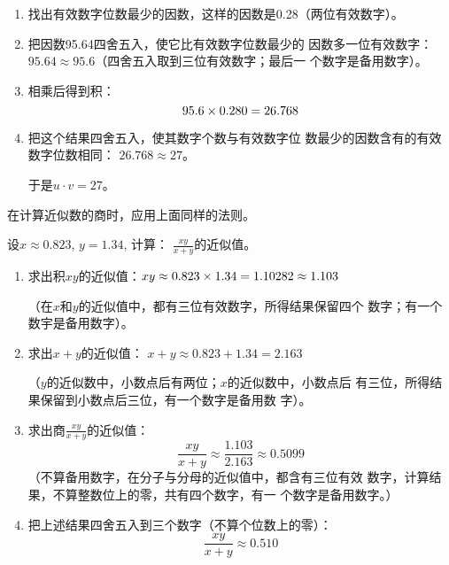 \begin{solution}
\begin{enumerate}
    \item 找出有效数字位数最少的因数，这样的因数是0.28（两位有效数字）。
    \item 把因数95.64四舍五入，使它比有效数字位数最少的
因数多一位有效数字：$95.64\approx 95.6$（四舍五入取到三位有效数字；最后一
个数字是备用数字）。
\item 相乘后得到积：
\[95.6\times0.280=26.768\]
\item 把这个结果四舍五入，使其数字个数与有效数字位
数最少的因数含有的有效数字位数相同：
$26.768\approx 27$。

于是$u\cdot v=27$。
\end{enumerate}
\end{solution}

在计算近似数的商时，应用上面同样的法则。

\begin{example}
设$x\approx 0.823$, $y=1.34$, 计算：
$\frac{xy}{x+y}$的近似值。
\end{example}


\begin{solution}
\begin{enumerate}
    \item 求出积$xy$的近似值：$xy\approx 0.823\times1.34=1.10282\approx 1.103$
    
    （在$x$和$y$的近似值中，都有三位有效数字，所得结果保留四个
数字；有一个数宇是备用数字）。
\item 求出$x+y$的近似值：
$x+y\approx 0.823+1.34=2.163$

（$y$的近似数中，小数点后有两位；$x$的近似数中，小数点后
有三位，所得结果保留到小数点后三位，有一个数字是备用数
字）。
\item 求出商$\frac{xy}{x+y}$的近似值：
\[\frac{xy}{x+y}\approx \frac{1.103}{2.163}\approx 0.5099\]
（不算备用数字，在分子与分母的近似值中，都含有三位有效
数字，计算结果，不算整数位上的零，共有四个数字，有一
个数字是备用数字。）

\item 把上述结果四舍五入到三个数字（不算个位数上的零）：
\[\frac{xy}{x+y}\approx 0.510\]
\end{enumerate}    
\end{solution}

